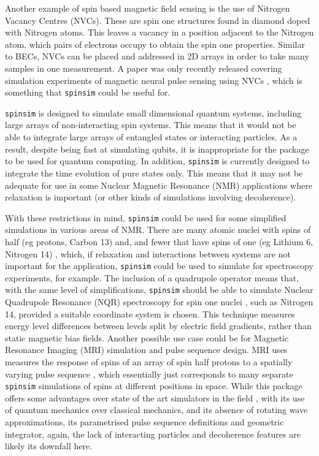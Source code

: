 \documentclass{jors}
\begin{document}
		Another example of spin based magnetic field sensing is the use of Nitrogen Vacancy Centres (NVCs). These are spin one structures found in diamond doped with Nitrogen atoms. This leaves a vacancy in a position adjacent to the Nitrogen atom, which pairs of electrons occupy to obtain the spin one properties. Similar to BECs, NVCs can be placed and addressed in 2D arrays in order to take many samples in one measurement. A paper was only recently released covering simulation experiments of magnetic neural pulse sensing using NVCs \cite{parashar_axon_2020}, which is something that \texttt{spinsim} could be useful for.

		\texttt{spinsim} is designed to simulate small dimensional quantum systems, including large arrays of non-interacting spin systems. This means that it would not be able to integrate large arrays of entangled states or interacting particles. As a result, despite being fast at simulating qubits, it is inappropriate for the package to be used for quantum computing. In addition, \texttt{spinsim} is currently designed to integrate the time evolution of pure states only. This means that it may not be adequate for use in some Nuclear Magnetic Resonance (NMR) applications where relaxation \cite{veshtort_spinevolution_2006} is important (or other kinds of simulations involving decoherence).

		With these restrictions in mind, \texttt{spinsim} could be used for some simplified simulations in various areas of NMR. There are many atomic nuclei with spins of half (eg protons, Carbon 13) and, and fewer that have spins of one (eg Lithium 6, Nitrogen 14) \cite{fuller_nuclear_1976}, which, if relaxation and interactions between systems are not important for the application, \texttt{spinsim} could be used to simulate for spectroscopy experiments, for example. The inclusion of a quadrupole operator means that, with the same level of simplifications, \texttt{spinsim} should be able to simulate Nuclear Quadrupole Resonance (NQR) spectroscopy for spin one nuclei \cite{bain_nqr_2004}, such as Nitrogen 14, provided a suitable coordinate system is chosen. This technique measures energy level differences between levels split by electric field gradients, rather than static magnetic bias fields. Another possible use case could be for Magnetic Resonance Imaging (MRI) simulation and pulse sequence design. MRI uses measures the response of spins of an array of spin half protons to a spatially varying pulse sequence \cite{mckinnon_physics_1998}, which essentially just corresponds to many separate \texttt{spinsim} simulations of spins at different positions in space. While this package offers some advantages over state of the art simulators in the field \cite{kose_fast_2019}, with its use of quantum mechanics over classical mechanics, and its absence of rotating wave approximations, its parametrised pulse sequence definitions and geometric integrator, again, the lack of interacting particles and decoherence features are likely its downfall here.
\end{document}
